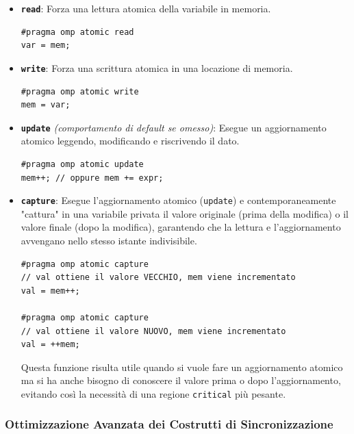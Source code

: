 \begin{itemize}
    \item \textbf{\texttt{read}}: Forza una lettura atomica della variabile in memoria.
    \begin{verbatim}
#pragma omp atomic read
var = mem;
    \end{verbatim}
    
    \item \textbf{\texttt{write}}: Forza una scrittura atomica in una locazione di memoria.
    \begin{verbatim}
#pragma omp atomic write
mem = var;
    \end{verbatim}
    
    \item \textbf{\texttt{update}} \textit{(comportamento di default se omesso)}: Esegue un aggiornamento atomico leggendo, modificando e riscrivendo il dato.
    \begin{verbatim}
#pragma omp atomic update
mem++; // oppure mem += expr;
    \end{verbatim}

    \item \textbf{\texttt{capture}}: Esegue l'aggiornamento atomico (\texttt{update}) e contemporaneamente "cattura" in una variabile privata il valore originale (prima della modifica) o il valore finale (dopo la modifica), garantendo che la lettura e l'aggiornamento avvengano nello stesso istante indivisibile.
    \begin{verbatim}
#pragma omp atomic capture
// val ottiene il valore VECCHIO, mem viene incrementato
val = mem++; 

#pragma omp atomic capture
// val ottiene il valore NUOVO, mem viene incrementato  
val = ++mem; 
    \end{verbatim}
    Questa funzione risulta utile quando si vuole fare un aggiornamento atomico ma si ha anche bisogno di conoscere il valore prima o dopo l'aggiornamento, evitando così la necessità di una regione \texttt{critical} più pesante.
\end{itemize}


\subsubsection*{Ottimizzazione Avanzata dei Costrutti di Sincronizzazione}


